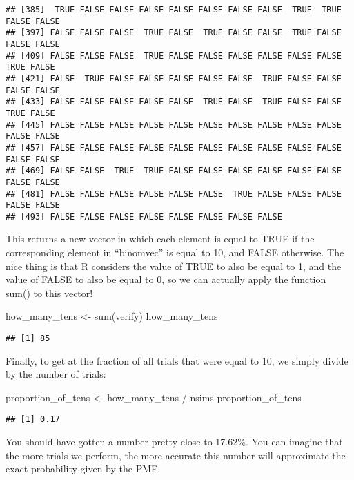 \documentclass[
]{book}
\newenvironment{Shaded}{\begin{snugshade}}{\end{snugshade}}
\newcommand{\FunctionTok}[1]{\textcolor[rgb]{0.00,0.00,0.00}{#1}}
\newcommand{\NormalTok}[1]{#1}
\newcommand{\OtherTok}[1]{\textcolor[rgb]{0.56,0.35,0.01}{#1}}
\newcommand{\SpecialCharTok}[1]{\textcolor[rgb]{0.00,0.00,0.00}{#1}}
\begin{document}
\begin{verbatim}
## [385]  TRUE FALSE FALSE FALSE FALSE FALSE FALSE FALSE  TRUE  TRUE FALSE FALSE
## [397] FALSE FALSE FALSE  TRUE FALSE  TRUE FALSE FALSE  TRUE FALSE FALSE FALSE
## [409] FALSE FALSE FALSE  TRUE FALSE FALSE FALSE FALSE FALSE FALSE  TRUE FALSE
## [421] FALSE  TRUE FALSE FALSE FALSE FALSE FALSE  TRUE FALSE FALSE FALSE FALSE
## [433] FALSE FALSE FALSE FALSE FALSE  TRUE FALSE  TRUE FALSE FALSE  TRUE FALSE
## [445] FALSE FALSE FALSE FALSE FALSE FALSE FALSE FALSE FALSE FALSE FALSE FALSE
## [457] FALSE FALSE FALSE FALSE FALSE FALSE FALSE FALSE FALSE FALSE FALSE FALSE
## [469] FALSE FALSE  TRUE  TRUE FALSE FALSE FALSE FALSE FALSE FALSE FALSE FALSE
## [481] FALSE FALSE FALSE FALSE FALSE FALSE  TRUE FALSE FALSE FALSE FALSE FALSE
## [493] FALSE FALSE FALSE FALSE FALSE FALSE FALSE FALSE
\end{verbatim}

This returns a new vector in which each element is equal to TRUE if the corresponding element in ``binomvec'' is equal to 10, and FALSE otherwise. The nice thing is that R considers the value of TRUE to also be equal to 1, and the value of FALSE to also be equal to 0, so we can actually apply the function sum() to this vector!

\begin{Shaded}
\begin{Highlighting}[]
\NormalTok{how\_many\_tens }\OtherTok{\textless{}{-}} \FunctionTok{sum}\NormalTok{(verify)}
\NormalTok{how\_many\_tens}
\end{Highlighting}
\end{Shaded}

\begin{verbatim}
## [1] 85
\end{verbatim}

Finally, to get at the fraction of all trials that were equal to 10, we simply divide by the number of trials:

\begin{Shaded}
\begin{Highlighting}[]
\NormalTok{proportion\_of\_tens }\OtherTok{\textless{}{-}}\NormalTok{ how\_many\_tens }\SpecialCharTok{/}\NormalTok{ nsims}
\NormalTok{proportion\_of\_tens}
\end{Highlighting}
\end{Shaded}

\begin{verbatim}
## [1] 0.17
\end{verbatim}

You should have gotten a number pretty close to 17.62\%. You can imagine that the more trials we perform, the more accurate this number will approximate the exact probability given by the PMF.
\end{document}
